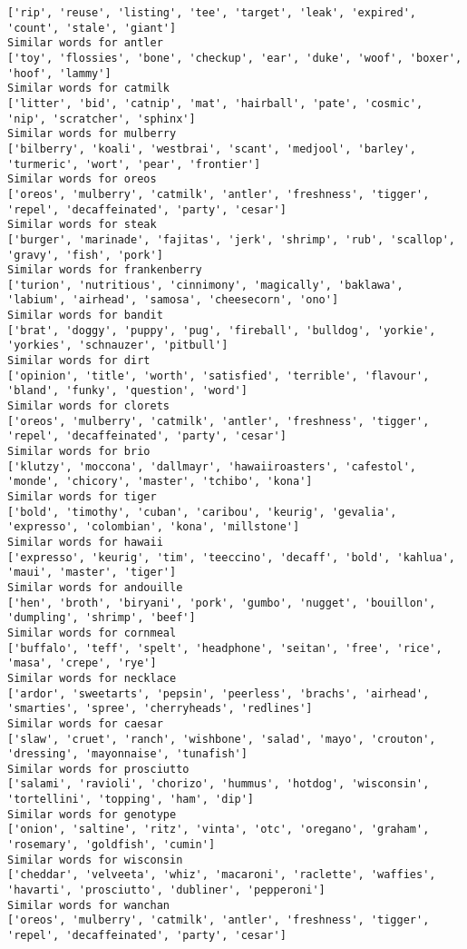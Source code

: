 \documentclass[11pt]{article}
\begin{document}
\begin{Verbatim}[commandchars=\\\{\}]
['rip', 'reuse', 'listing', 'tee', 'target', 'leak', 'expired', 'count', 'stale', 'giant']
Similar words for antler
['toy', 'flossies', 'bone', 'checkup', 'ear', 'duke', 'woof', 'boxer', 'hoof', 'lammy']
Similar words for catmilk
['litter', 'bid', 'catnip', 'mat', 'hairball', 'pate', 'cosmic', 'nip', 'scratcher', 'sphinx']
Similar words for mulberry
['bilberry', 'koali', 'westbrai', 'scant', 'medjool', 'barley', 'turmeric', 'wort', 'pear', 'frontier']
Similar words for oreos
['oreos', 'mulberry', 'catmilk', 'antler', 'freshness', 'tigger', 'repel', 'decaffeinated', 'party', 'cesar']
Similar words for steak
['burger', 'marinade', 'fajitas', 'jerk', 'shrimp', 'rub', 'scallop', 'gravy', 'fish', 'pork']
Similar words for frankenberry
['turion', 'nutritious', 'cinnimony', 'magically', 'baklawa', 'labium', 'airhead', 'samosa', 'cheesecorn', 'ono']
Similar words for bandit
['brat', 'doggy', 'puppy', 'pug', 'fireball', 'bulldog', 'yorkie', 'yorkies', 'schnauzer', 'pitbull']
Similar words for dirt
['opinion', 'title', 'worth', 'satisfied', 'terrible', 'flavour', 'bland', 'funky', 'question', 'word']
Similar words for clorets
['oreos', 'mulberry', 'catmilk', 'antler', 'freshness', 'tigger', 'repel', 'decaffeinated', 'party', 'cesar']
Similar words for brio
['klutzy', 'moccona', 'dallmayr', 'hawaiiroasters', 'cafestol', 'monde', 'chicory', 'master', 'tchibo', 'kona']
Similar words for tiger
['bold', 'timothy', 'cuban', 'caribou', 'keurig', 'gevalia', 'expresso', 'colombian', 'kona', 'millstone']
Similar words for hawaii
['expresso', 'keurig', 'tim', 'teeccino', 'decaff', 'bold', 'kahlua', 'maui', 'master', 'tiger']
Similar words for andouille
['hen', 'broth', 'biryani', 'pork', 'gumbo', 'nugget', 'bouillon', 'dumpling', 'shrimp', 'beef']
Similar words for cornmeal
['buffalo', 'teff', 'spelt', 'headphone', 'seitan', 'free', 'rice', 'masa', 'crepe', 'rye']
Similar words for necklace
['ardor', 'sweetarts', 'pepsin', 'peerless', 'brachs', 'airhead', 'smarties', 'spree', 'cherryheads', 'redlines']
Similar words for caesar
['slaw', 'cruet', 'ranch', 'wishbone', 'salad', 'mayo', 'crouton', 'dressing', 'mayonnaise', 'tunafish']
Similar words for prosciutto
['salami', 'ravioli', 'chorizo', 'hummus', 'hotdog', 'wisconsin', 'tortellini', 'topping', 'ham', 'dip']
Similar words for genotype
['onion', 'saltine', 'ritz', 'vinta', 'otc', 'oregano', 'graham', 'rosemary', 'goldfish', 'cumin']
Similar words for wisconsin
['cheddar', 'velveeta', 'whiz', 'macaroni', 'raclette', 'waffies', 'havarti', 'prosciutto', 'dubliner', 'pepperoni']
Similar words for wanchan
['oreos', 'mulberry', 'catmilk', 'antler', 'freshness', 'tigger', 'repel', 'decaffeinated', 'party', 'cesar']

\end{Verbatim}
\end{document}
